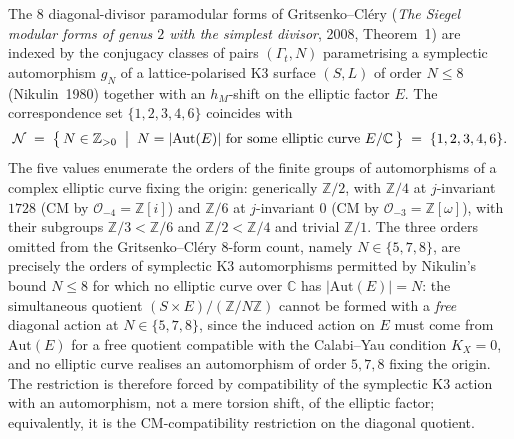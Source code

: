 \begin{lemma}
\label{lem:programme-scope-aut-elliptic-curve}
The $8$ diagonal-divisor paramodular forms of
Gritsenko--Cl\'ery (\emph{The Siegel modular forms of genus $2$ with
the simplest divisor}, 2008, Theorem~1) are indexed by the conjugacy
classes of pairs $(\Gamma_t, N)$ parametrising a symplectic
automorphism $g_N$ of a lattice-polarised K3 surface $(S,L)$ of order
$N \leq 8$ (Nikulin~1980) together with an $h_M$-shift on the elliptic
factor $E$. The correspondence set $\{1, 2, 3, 4, 6\}$ coincides with
\[
 \mathcal{N} \;=\; \bigl\{\,N \in \mathbb{Z}_{>0} \;\bigm|\;
 N = |\mathrm{Aut}(E)| \text{ for some elliptic curve } E/\mathbb{C}\,\bigr\}
 \;=\; \{1, 2, 3, 4, 6\}.
\]
The five values enumerate the orders of the finite groups of
automorphisms of a complex elliptic curve fixing the origin:
generically $\mathbb{Z}/2$, with $\mathbb{Z}/4$ at
$j$-invariant $1728$ (CM by $\mathcal{O}_{-4} = \mathbb{Z}[i]$) and
$\mathbb{Z}/6$ at $j$-invariant $0$ (CM by
$\mathcal{O}_{-3} = \mathbb{Z}[\omega]$), with their subgroups
$\mathbb{Z}/3 < \mathbb{Z}/6$ and $\mathbb{Z}/2 < \mathbb{Z}/4$ and
trivial $\mathbb{Z}/1$. The three orders omitted from the
Gritsenko--Cl\'ery $8$-form count, namely $N \in \{5, 7, 8\}$, are
precisely the orders of symplectic K3 automorphisms permitted by
Nikulin's bound $N \leq 8$ for which no elliptic curve over
$\mathbb{C}$ has $|\mathrm{Aut}(E)| = N$: the simultaneous quotient
$(S \times E)/(\mathbb{Z}/N\mathbb{Z})$ cannot be formed with a
\emph{free} diagonal action at $N \in \{5, 7, 8\}$, since the induced
action on $E$ must come from $\mathrm{Aut}(E)$ for a free quotient
compatible with the Calabi--Yau condition $K_X = 0$, and no elliptic
curve realises an automorphism of order $5, 7, 8$ fixing the origin.
The restriction is therefore forced by compatibility of the
symplectic K3 action with an automorphism, not a mere torsion shift,
of the elliptic factor; equivalently, it is the CM-compatibility
restriction on the diagonal quotient.
\end{lemma}

